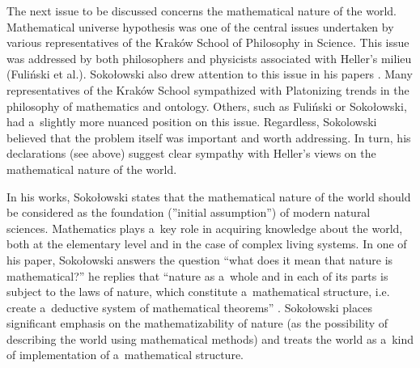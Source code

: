 \documentclass[%
  manuscript=article,
  year=2024,
  volume=77,
  doi=00000.000,
]{zfn}
\begin{document}
The next issue to be discussed concerns the mathematical nature of the world. Mathematical universe hypothesis was one of the central issues undertaken by various representatives of the Kraków School of Philosophy in Science. This issue was addressed by both philosophers and physicists associated with Heller's milieu (Fuliński et al.). Sokołowski also drew attention to this issue in his papers 
\parencites[see e.g,][]{Sokoowski1987Alberta}[][]{Sokoowski1990Nadwyzkowosc}[][]{Sokoowski2011Pare}[][]{Sokoowski2015Co}. %
 Many representatives of the Kraków School sympathized with Platonizing trends in the philosophy of mathematics and ontology. Others, such as Fuliński or Sokołowski, had a~slightly more nuanced position on this issue. Regardless, Sokolowski believed that the problem itself was important and worth addressing. In turn, his declarations (see above) suggest clear sympathy with Heller's views on the mathematical nature of the world.



In his works, Sokołowski states that the mathematical nature of the world should be considered as the foundation (''initial assumption'') of modern natural sciences. Mathematics plays a~key role in acquiring knowledge about the world, both at the elementary level and in the case of complex living systems. In one of his paper, Sokołowski answers the question ``what does it mean that nature is mathematical?'' he replies that ``nature as a~whole and in each of its parts is subject to the laws of nature, which constitute a~mathematical structure, i.e. create a~deductive system of mathematical theorems''
\parencite[][]{Sokoowski1990Nadwyzkowosc}. %
 Sokołowski places significant emphasis on the mathematizability of nature (as the possibility of describing the world using mathematical methods) and treats the world as a~kind of implementation of a~mathematical structure.
\end{document}
